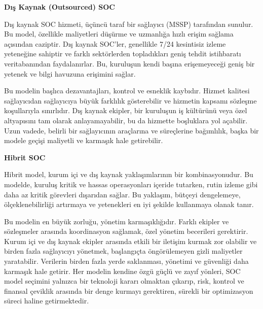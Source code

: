 \textbf{Dış Kaynak (Outsourced) SOC}

Dış kaynak SOC hizmeti, üçüncü taraf bir sağlayıcı (MSSP) tarafından sunulur. Bu model, özellikle maliyetleri düşürme ve uzmanlığa hızlı erişim sağlama açısından caziptir. Dış kaynak SOC'ler, genellikle 7/24 kesintisiz izleme yeteneğine sahiptir ve farklı sektörlerden topladıkları geniş tehdit istihbaratı veritabanından faydalanırlar. Bu, kuruluşun kendi başına erişemeyeceği geniş bir yetenek ve bilgi havuzuna erişimini sağlar.

Bu modelin başlıca dezavantajları, kontrol ve esneklik kaybıdır. Hizmet kalitesi sağlayıcıdan sağlayıcıya büyük farklılık gösterebilir ve hizmetin kapsamı sözleşme koşullarıyla sınırlıdır. Dış kaynak ekipler, bir kuruluşun iş kültürünü veya özel altyapısını tam olarak anlayamayabilir, bu da hizmette boşluklara yol açabilir. Uzun vadede, belirli bir sağlayıcının araçlarına ve süreçlerine bağımlılık, başka bir modele geçişi maliyetli ve karmaşık hale getirebilir.

\textbf{Hibrit SOC}

Hibrit model, kurum içi ve dış kaynak yaklaşımlarının bir kombinasyonudur. Bu modelde, kuruluş kritik ve hassas operasyonları içeride tutarken, rutin izleme gibi daha az kritik görevleri dışarıdan sağlar. Bu yaklaşım, bütçeyi dengelemeye, ölçeklenebilirliği artırmaya ve yetenekleri en iyi şekilde kullanmaya olanak tanır.

Bu modelin en büyük zorluğu, yönetim karmaşıklığıdır. Farklı ekipler ve sözleşmeler arasında koordinasyon sağlamak, özel yönetim becerileri gerektirir. Kurum içi ve dış kaynak ekipler arasında etkili bir iletişim kurmak zor olabilir ve birden fazla sağlayıcıyı yönetmek, başlangıçta öngörülemeyen gizli maliyetler yaratabilir. Verilerin birden fazla yerde saklanması, yönetimi ve güvenliği daha karmaşık hale getirir. Her modelin kendine özgü güçlü ve zayıf yönleri, SOC model seçimini yalnızca bir teknoloji kararı olmaktan çıkarıp, risk, kontrol ve finansal çeviklik arasında bir denge kurmayı gerektiren, sürekli bir optimizasyon süreci haline getirmektedir.

